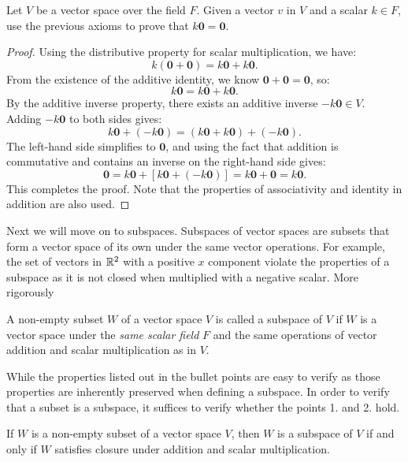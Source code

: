 \documentclass[12pt]{article}
\begin{document}
\begin{example}
    Let $V$ be a vector space over the field $F$. Given a vector $v$ in $V$ and a scalar $k \in F$, use the previous axioms to prove that $k\mathbf{0}=\mathbf{0}$.
\end{example}

\begin{proof}
    Using the distributive property for scalar multiplication, we have:
    \[
    k(\mathbf{0}+\mathbf{0})=k\mathbf{0}+k\mathbf{0}.
    \]
    From the existence of the additive identity, we know $\mathbf{0}+\mathbf{0}=\mathbf{0}$, so:
    \[
    k\mathbf{0}=k\mathbf{0}+k\mathbf{0}.
    \]
    By the additive inverse property, there exists an additive inverse $-k\mathbf{0}\in V$. Adding $-k\mathbf{0}$ to both
    sides gives:
    \[
    k\mathbf{0}+(-k\mathbf{0})=(k\mathbf{0}+k\mathbf{0})+(-k\mathbf{0}).
    \]
    The left-hand side simplifies to $\mathbf{0}$, and using the fact that addition is commutative and contains an inverse on the right-hand side gives:
    \[
    \mathbf{0} = k\mathbf{0}+[k\mathbf{0}+(-k\mathbf{0})] = k\mathbf{0}+\mathbf{0} = k\mathbf{0}.
    \]
    This completes the proof. Note that the properties of associativity and identity in addition are also used.
\end{proof}

Next we will move on to subspaces. Subspaces of vector spaces are subsets that form a vector space of its own under the same vector operations. For example, the set of vectors in $\mathbb{R}^2$ with a positive $x$ component violate the properties of a subspace as it is not closed when multiplied with a negative scalar. More rigorously

\begin{definition}[Subspace]
    A non-empty subset $W$ of a vector space $V$ is called a subspace of $V$ if $W$ is a vector space under the \emph{same scalar field} $F$ and the same operations of vector addition and scalar multiplication as in $V$. 
\end{definition}

While the properties listed out in the bullet points are easy to verify as those properties are inherently preserved when defining a subspace. In order to verify that a subset is a subspace, it suffices to verify whether the points 1. and 2. hold.  

\begin{theorem}
    If $W$ is a non-empty subset of a vector space $V$, then $W$ is a subspace of $V$ if and only if $W$ satisfies closure under addition and scalar multiplication.
\end{theorem}
\end{document}
